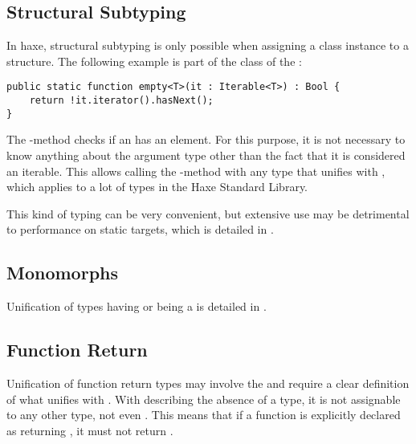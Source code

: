 \documentclass{haxe}
\begin{document}
\subsection{Structural Subtyping}
\label{type-system-structural-subtyping}


In haxe, structural subtyping is only possible when assigning a class instance to a structure. The following example is part of the  class of the :

\begin{lstlisting}
public static function empty<T>(it : Iterable<T>) : Bool {
	return !it.iterator().hasNext();
}
\end{lstlisting}
The -method checks if an  has an element. For this purpose, it is not necessary to know anything about the argument type other than the fact that it is considered an iterable. This allows calling the -method with any type that unifies with , which applies to a lot of types in the Haxe Standard Library.

This kind of typing can be very convenient, but extensive use may be detrimental to performance on static targets, which is detailed in .


\subsection{Monomorphs}
\label{type-system-monomorphs}

Unification of types having or being a  is detailed in .


\subsection{Function Return}
\label{type-system-unification-function-return}

Unification of function return types may involve the  and require a clear definition of what unifies with . With  describing the absence of a type, it is not assignable to any other type, not even . This means that if a function is explicitly declared as returning , it must not return .
\end{document}

